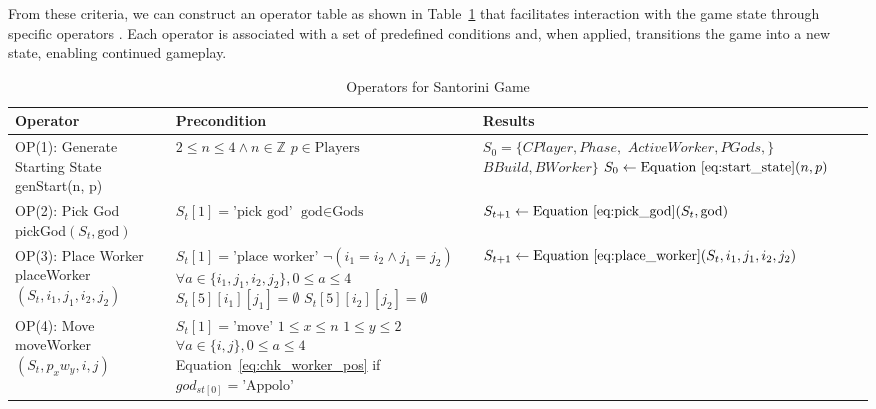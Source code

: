 \documentclass{telkomnika}
\begin{document}
From these criteria, we can construct an operator table as shown in Table~\ref{tab:operators} that facilitates interaction with the game state through specific operators \cite{krisnadi2016}.
Each operator is associated with a set of predefined conditions and, when applied, transitions the game into a new state, enabling continued gameplay.

\begin{table}[h]
\caption{Operators for Santorini Game}
\label{tab:operators}
\begin{tabularx}{\textwidth}{|X|X|X|}
\hline
\textbf{Operator} & \textbf{Precondition} & \textbf{Results} \\ \hline
OP(1): Generate Starting State \newline genStart(n, p) & 
$2 \leq n \leq 4 \land n \in \mathbb{Z}$ \newline $p \in \text{Players}$ & 
$S_0 = \{CPlayer, Phase,$
$ActiveWorker, PGods,\}$
$BBuild, BWorker\}$ \newline
$S_0 \gets \text{Equation~\ref{eq:start_state}}(n, p)$ \\ \hline
OP(2): Pick God \newline pickGod$(S_t, \text{god})$ & 
$S_t[1] = \text{'pick god'}$ \newline $\text{god} \in \text{Gods}$ & 
$S_{t+1} \gets \text{Equation~\ref{eq:pick_god}}(S_t, \text{god})$ \\ \hline
OP(3): Place Worker \newline placeWorker$(S_t, i_1, j_1, i_2, j_2)$ & 
$S_t[1] = \text{'place worker'}$ \newline $\neg(i_1 = i_2 \land j_1 = j_2)$ \newline $\forall a \in \{i_1, j_1, i_2, j_2\}, 0 \leq a \leq 4$ \newline $S_t[5][i_1][j_1] = \emptyset$ \newline $S_t[5][i_2][j_2] = \emptyset$ & 
$S_{t+1} \gets \text{Equation~\ref{eq:place_worker}}(S_t, i_1, j_1, i_2, j_2)$ \\ \hline
OP(4): Move \newline moveWorker$(S_t, p_xw_y, i, j)$ & 
$S_t[1] = \text{'move'}$ \newline $1 \leq x \leq n$ \newline $1 \leq y \leq 2$ \newline $\forall a \in \{i, j\}, 0 \leq a \leq 4$ \newline
Equation~\ref{eq:chk_worker_pos} \newline
if $god_{st[0]} =  \text{'Appolo'}$\newline

\end{tabularx}
\end{table}
\end{document}
